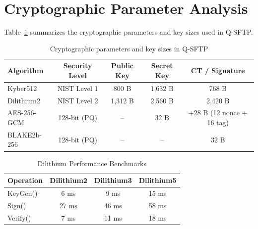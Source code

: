\section{Cryptographic Parameter Analysis}

Table~\ref{tab:crypto_params} summarizes the cryptographic parameters and key sizes used in Q-SFTP.

\begin{table}[H]
    \centering
    \caption{Cryptographic parameters and key sizes in Q-SFTP}
    \label{tab:crypto_params}
    \begin{tabular}{|l|c|c|c|c|}
        \hline
        \textbf{Algorithm} & \textbf{Security Level} & \textbf{Public Key} & \textbf{Secret Key} & \textbf{CT / Signature} \\
        \hline
        Kyber512 & NIST Level 1 & 800 B & 1,632 B & 768 B \\
        \hline
        Dilithium2 & NIST Level 2 & 1,312 B & 2,560 B & 2,420 B \\
        \hline
        AES-256-GCM & 128-bit (PQ) & -- & 32 B & +28 B (12 nonce + 16 tag) \\
        \hline
        BLAKE2b-256 & 128-bit (PQ) & -- & -- & 32 B \\
        \hline
    \end{tabular}
\end{table}

\begin{table}[H]
    \centering
    \caption{Dilithium Performance Benchmarks}
    \vspace{2pt}
    \label{tab:dilithium_benchmarks}
    \begin{tabular}{|l|c|c|c|}
        \hline
        \textbf{Operation} & \textbf{Dilithium2} & \textbf{Dilithium3} & \textbf{Dilithium5} \\
        \hline
        KeyGen() & 6 ms & 9 ms & 15 ms \\
        \hline
        Sign() & 27 ms & 46 ms & 58 ms \\
        \hline
        Verify() & 7 ms & 11 ms & 18 ms \\
        \hline
    \end{tabular}
    \vspace{2pt}
\end{table}

